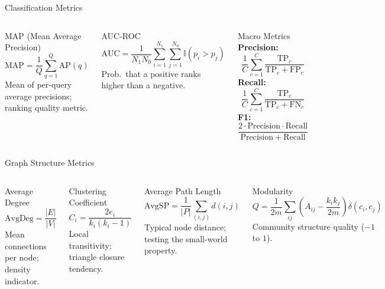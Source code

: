\documentclass[aspectratio=169,xcolor=dvipsnames]{beamer}
\begin{document}
\begin{frame}{Classification Metrics }
	\begin{columns}[t]
		\begin{block}{MAP (Mean Average Precision)}
			\[
				\mathrm{MAP}=\frac{1}{Q}\sum_{q=1}^Q\mathrm{AP}(q)
			\]
			Mean of per-query average precisions; ranking quality metric.
		\end{block}

		\begin{block}{AUC-ROC}
			\[
				\mathrm{AUC} = \frac{1}{N_1 N_0} \sum_{i=1}^{N_1} \sum_{j=1}^{N_0} \mathbb{I}(p_i > p_j)
			\]
			Prob.\ that a positive ranks higher than a negative.
		\end{block}

		\begin{block}{Macro Metrics}
			\footnotesize
			\textbf{Precision:}
			\[
				\frac{1}{C}\sum_{c=1}^C\frac{\mathrm{TP}_c}{\mathrm{TP}_c+\mathrm{FP}_c}
			\]
			\textbf{Recall:}
			\[
				\frac{1}{C}\sum_{c=1}^C\frac{\mathrm{TP}_c}{\mathrm{TP}_c+\mathrm{FN}_c}
			\]
			\textbf{F1:}
			\[
				\frac{2 \cdot \mathrm{Precision} \cdot \mathrm{Recall}}{\mathrm{Precision} + \mathrm{Recall}}
			\]
		\end{block}
	\end{columns}
\end{frame}

\begin{frame}{Graph Structure Metrics }
	\begin{columns}[t]
		\begin{block}{Average Degree}
			\[
				\text{AvgDeg} = \frac{|E|}{|V|}
			\]
			Mean connections per node; density indicator.
		\end{block}

		\begin{block}{Clustering Coefficient}
			\[
				C_i = \frac{2e_i}{k_i(k_i-1)}
			\]
			Local transitivity; triangle closure tendency.
		\end{block}

		\begin{block}{Average Path Length}
			\[
				\text{AvgSP} = \frac{1}{|P|}\sum_{(i,j)} d(i,j)
			\]
			Typical node distance; testing the small-world property.
		\end{block}

		\begin{block}{Modularity}
			\[
				Q = \frac{1}{2m}\sum_{ij}\left(A_{ij} - \frac{k_i k_j}{2m}\right)\delta(c_i, c_j)
			\]
			Community structure quality ($-1$ to $1$).
		\end{block}
	\end{columns}
\end{frame}
\end{document}
